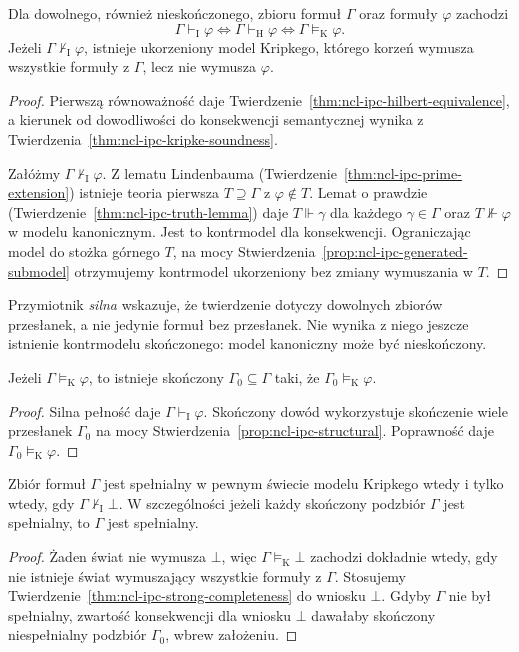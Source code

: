 \begin{twierdzenie}
\label{thm:ncl-ipc-strong-completeness}
Dla dowolnego, również nieskończonego, zbioru
formuł $\Gamma$ oraz formuły $\varphi$ zachodzi
\[
 \Gamma\vdash_{\mathrm I}\varphi
 \iff \Gamma\vdash_{\mathrm H}\varphi
 \iff \Gamma\models_{\mathrm K}\varphi.
\]
Jeżeli $\Gamma\nvdash_{\mathrm I}\varphi$, istnieje
ukorzeniony model Kripkego, którego korzeń wymusza
wszystkie formuły z $\Gamma$, lecz nie wymusza
$\varphi$.
\end{twierdzenie}
\begin{proof}
Pierwszą równoważność daje
Twierdzenie~\ref{thm:ncl-ipc-hilbert-equivalence},
a kierunek od dowodliwości do konsekwencji
semantycznej wynika z
Twierdzenia~\ref{thm:ncl-ipc-kripke-soundness}.

Załóżmy $\Gamma\nvdash_{\mathrm I}\varphi$.
Z lematu Lindenbauma
(Twierdzenie~\ref{thm:ncl-ipc-prime-extension})
istnieje teoria pierwsza $T\supseteq\Gamma$
z $\varphi\notin T$. Lemat o prawdzie
(Twierdzenie~\ref{thm:ncl-ipc-truth-lemma})
daje $T\Vdash\gamma$ dla każdego $\gamma\in\Gamma$
oraz $T\not\Vdash\varphi$ w modelu kanonicznym.
Jest to kontrmodel dla konsekwencji.
Ograniczając model do stożka górnego $T$,
na mocy Stwierdzenia~\ref{prop:ncl-ipc-generated-submodel}
otrzymujemy kontrmodel ukorzeniony bez zmiany
wymuszania w $T$.
\end{proof}
Przymiotnik \emph{silna} wskazuje, że twierdzenie
dotyczy dowolnych zbiorów przesłanek, a nie jedynie
formuł bez przesłanek. Nie wynika z niego jeszcze
istnienie kontrmodelu skończonego: model kanoniczny
może być nieskończony.

\begin{wniosek}
\label{cor:ncl-ipc-compactness}
Jeżeli $\Gamma\models_{\mathrm K}\varphi$, to istnieje
skończony $\Gamma_0\subseteq\Gamma$ taki, że
$\Gamma_0\models_{\mathrm K}\varphi$.
\end{wniosek}
\begin{proof}
Silna pełność daje $\Gamma\vdash_{\mathrm I}\varphi$.
Skończony dowód wykorzystuje skończenie wiele
przesłanek $\Gamma_0$ na mocy
Stwierdzenia~\ref{prop:ncl-ipc-structural}.
Poprawność daje $\Gamma_0\models_{\mathrm K}\varphi$.
\end{proof}

\begin{wniosek}
\label{cor:ncl-ipc-consistency-satisfiability}
Zbiór formuł $\Gamma$ jest spełnialny w pewnym
świecie modelu Kripkego wtedy i tylko wtedy,
gdy $\Gamma\nvdash_{\mathrm I}\bot$.
W szczególności jeżeli każdy skończony podzbiór
$\Gamma$ jest spełnialny, to $\Gamma$ jest spełnialny.
\end{wniosek}
\begin{proof}
Żaden świat nie wymusza $\bot$, więc
$\Gamma\models_{\mathrm K}\bot$ zachodzi dokładnie
wtedy, gdy nie istnieje świat wymuszający
wszystkie formuły z $\Gamma$. Stosujemy
Twierdzenie~\ref{thm:ncl-ipc-strong-completeness}
do wniosku $\bot$.
Gdyby $\Gamma$ nie był spełnialny, zwartość
konsekwencji dla wniosku $\bot$ dawałaby skończony
niespełnialny podzbiór $\Gamma_0$, wbrew założeniu.
\end{proof}


